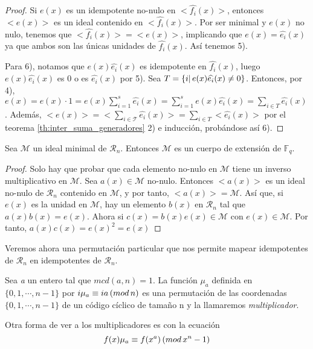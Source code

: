 \begin{proof}
Si $e(x)$ es un idempotente no-nulo en $<\widehat{f_i}(x)>$, entonces $<e(x)>$ es un ideal contenido en $<\widehat{f_i}(x)>$. Por ser minimal y $e(x)$ no nulo, tenemos que $<\widehat{f_i}(x)> = <e(x)>$, implicando que $e(x) = \widehat{e_i}(x)$ ya que ambos son las únicas unidades de $\widehat{f_i}(x)$. Así tenemos 5).

Para 6), notamos que $e(x)\widehat{e_i}(x)$ es idempotente en $\widehat{f_i}(x)$, luego $e(x)\widehat{e_i}(x)$ es 0 o es $\widehat{e_i}(x)$ por 5). Sea $T = \{ i | \thinspace e(x)\widehat{e_i}(x) \neq 0 \}$. Entonces, por 4), $e(x) = e(x) \cdot 1 = e(x)\sum_{i=1}^s \widehat{e_i}(x) = \sum_{i=1}^s e(x)\widehat{e_i}(x) = \sum_{i \in T} \widehat{e_i}(x)$. Además, $<e(x)> = < \sum_{i \in \mathcal{T}} \widehat{e_i}(x)> = \sum_{i \in T} <\widehat{e_i}(x)>$ por el teorema \ref{th:inter_suma_generadores} 2) e inducción, probándose así 6).
\end{proof}

\begin{theorem}
Sea $\mathcal{M}$ un ideal minimal de $\mathcal{R}_n$. Entonces $\mathcal{M}$ es un cuerpo de extensión de $\mathbb{F}_q$.
\end{theorem}

\begin{proof}
Solo hay que probar que cada elemento no-nulo en $\mathcal{M}$ tiene un inverso multiplicativo en $\mathcal{M}$. Sea $a(x) \in \mathcal{M}$ no-nulo. Entonces $<a(x)>$ es un ideal no-nulo de $\mathcal{R}_n$ contenido en $\mathcal{M}$, y por tanto, $<a(x)> = \mathcal{M}$. Así que, si $e(x)$ es la unidad en $\mathcal{M}$, hay un elemento $b(x)$ en $\mathcal{R}_n$ tal que $a(x)b(x) = e(x)$. Ahora si $c(x) = b(x)e(x) \in \mathcal{M}$ con $e(x) \in \mathcal{M}$. Por tanto, $a(x)c(x) = e(x)^2 = e(x) $
\end{proof}

Veremos ahora una permutación particular que nos permite mapear idempotentes de $\mathcal{R}_n$ en idempotentes de $\mathcal{R}_n$.

\begin{definition}
Sea \textit{a} un entero tal que $mcd(a,n) = 1$. La función $\mu_a$ definida en $ \{ 0,1 , \cdots , n-1 \}$ por $i\mu_a \equiv ia \thinspace (mod \thinspace n)$ es una permutación de las coordenadas $ \{ 0,1 , \cdots , n-1 \}$ de un código cíclico de tamaño n y la llamaremos \textit{multiplicador}.
\end{definition}

Otra forma de ver a los multiplicadores es con la ecuación 
\begin{equation}
f(x)\mu_a \equiv f(x^a) \thinspace (mod \thinspace x^n-1)
\end{equation}

